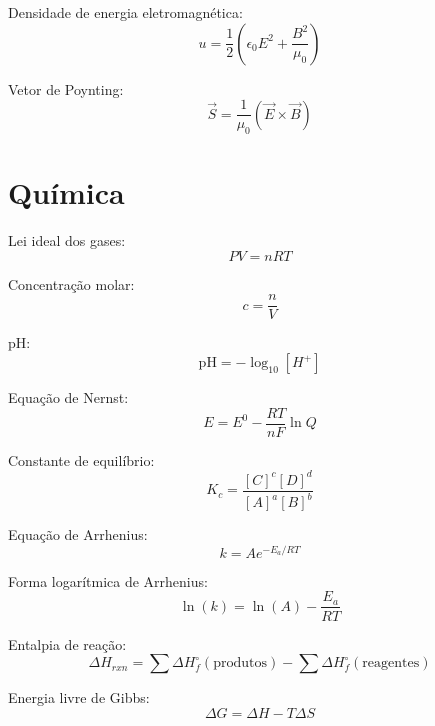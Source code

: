 Densidade de energia eletromagnética:
\begin{equation}
u = \frac{1}{2}\left(\epsilon_0 E^2 + \frac{B^2}{\mu_0}\right)
\end{equation}

Vetor de Poynting:
\begin{equation}
\vec{S} = \frac{1}{\mu_0}(\vec{E} \times \vec{B})
\end{equation}


\section{Química}

Lei ideal dos gases:
\begin{equation}
PV = nRT
\end{equation}

Concentração molar:
\begin{equation}
c = \frac{n}{V}
\end{equation}

pH:
\begin{equation}
\text{pH} = -\log_{10}[H^+]
\end{equation}

Equação de Nernst:
\begin{equation}
E = E^0 - \frac{RT}{nF}\ln Q
\end{equation}

Constante de equilíbrio:
\begin{equation}
K_c = \frac{[C]^c[D]^d}{[A]^a[B]^b}
\end{equation}

Equação de Arrhenius:
\begin{equation}
k = A e^{-E_a/RT}
\end{equation}

Forma logarítmica de Arrhenius:
\begin{equation}
\ln(k) = \ln(A) - \frac{E_a}{RT}
\end{equation}

Entalpia de reação:
\begin{equation}
\Delta H_{rxn} = \sum \Delta H_f^\circ(\text{produtos}) - \sum \Delta H_f^\circ(\text{reagentes})
\end{equation}

Energia livre de Gibbs:
\begin{equation}
\Delta G = \Delta H - T\Delta S
\end{equation}

